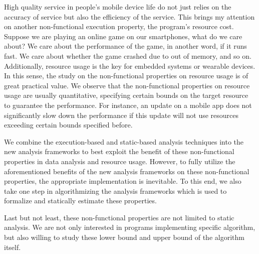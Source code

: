 High quality
service in people's mobile device life do not just relies on the accuracy of service but also the
 efficiency of the service. 
This brings my attention on another non-functional execution property, the program's resource cost.
Suppose we are playing an online game on our smartphones, what do we care about? We care about the performance of the game, in another word, if it runs fast. We care about whether the game crashed due to out of memory, and so on. Additionally, resource usage is the key for embedded systems or wearable devices. In this sense, the study on the non-functional properties on resource usage is of great practical value. We observe that the non-functional properties on resource usage are usually quantitative, specifying certain bounds on the target resource to guarantee the performance. For instance, an update on a mobile app does not significantly slow down the performance if this update will not use resources exceeding certain bounds specified before.


We combine the
execution-based and static-based
analysis techniques into the new
analysis frameworks to best exploit the benefit of these non-functional properties in data analysis and resource usage. However, to fully utilize the aforementioned benefits of the new analysis frameworks on these non-functional properties, the appropriate implementation is inevitable. 
To this end, we also take one step in algorithmizing the analysis frameworks
which is used to formalize and statically estimate these properties.

Last but not least, these non-functional properties are not limited to static analysis. We are not only interested in programs implementing specific algorithm, but also willing to study these lower bound and upper bound of the algorithm itself.

